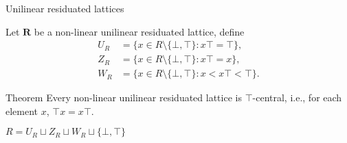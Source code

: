 \documentclass[professionalfont, handout, 12pt]{beamer} %
\theoremstyle{plain}
\theoremstyle{definition}
\newcommand{\m}[1]{{\mathbf {#1} }}
\begin{document}
\begin{comment}
        \filldraw [color = black, fill = white] (6, 2) circle (2.5pt);
        \filldraw [color = black, fill = white] (6, 1) circle (2.5pt);
        \filldraw [color = black, fill = white] (6, 0) circle (2.5pt)
            (6.3, 0.3) node [black] {};
        \filldraw [color = black, fill = white] (6, -1) circle (2.5pt);
        \filldraw [color = black, fill = white] (6, -2) circle (2.5pt);
    \end{tikzpicture}
    }
    \caption{Linear and non-linear URLs}
    \end{figure}
\end{frame}
\end{comment}

\begin{frame}{Unilinear residuated lattices}

    Let $\m R$ be a non-linear unilinear residuated lattice, define
    \begin{align*}
        U_R & = \{x \in R \setminus \{\bot, \top\}: x \top = \top\},\\
        Z_R & = \{x \in R \setminus \{\bot, \top\}: x \top = x\},\\
        W_R & = \{x \in R \setminus \{\bot, \top\}: x < x \top < \top\}.
    \end{align*}
    \pause

    \begin{block}{Theorem}\label{T-central}
        Every non-linear unilinear residuated lattice is $\top$-central, i.e., for each element $x$, $\top x = x \top$.
    \end{block}
    \medskip

    \begin{center}
        $R = U_R \sqcup Z_R \sqcup W_R \sqcup \{\bot, \top\}$ 
    \end{center}
    
\end{frame}
\end{document}
